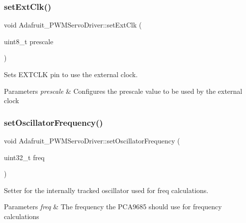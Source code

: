 \subsubsection{\texorpdfstring{set\+Ext\+Clk()}{setExtClk()}}
{\footnotesize\ttfamily void Adafruit\+\_\+\+P\+W\+M\+Servo\+Driver\+::set\+Ext\+Clk (\begin{DoxyParamCaption}\item[{uint8\+\_\+t}]{prescale }\end{DoxyParamCaption})}



Sets E\+X\+T\+C\+LK pin to use the external clock. 


\begin{DoxyParams}{Parameters}
{\em prescale} & Configures the prescale value to be used by the external clock \\
\hline
\end{DoxyParams}
\mbox{\label{classAdafruit__PWMServoDriver_ac725dd6b0d24d087586a854e81bcf6b3}} 
\subsubsection{\texorpdfstring{set\+Oscillator\+Frequency()}{setOscillatorFrequency()}}
{\footnotesize\ttfamily void Adafruit\+\_\+\+P\+W\+M\+Servo\+Driver\+::set\+Oscillator\+Frequency (\begin{DoxyParamCaption}\item[{uint32\+\_\+t}]{freq }\end{DoxyParamCaption})}



Setter for the internally tracked oscillator used for freq calculations. 


\begin{DoxyParams}{Parameters}
{\em freq} & The frequency the P\+C\+A9685 should use for frequency calculations \\
\hline
\end{DoxyParams}
\mbox{\label{classAdafruit__PWMServoDriver_a8d18d478574c8c686e94faefe11094b9}} 
